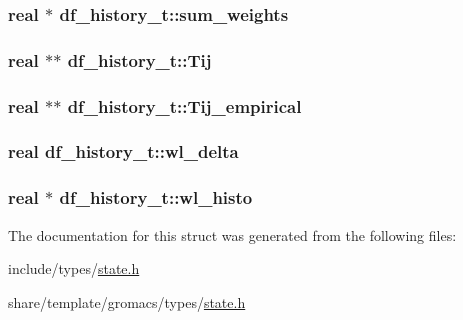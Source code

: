 \hypertarget{structdf__history__t_a45cdb272f6c0ecac43c61c3aa3255e80}{
\subsubsection[{sum\-\_\-weights}]{\setlength{\rightskip}{0pt plus 5cm}real $\ast$ {\bf df\-\_\-history\-\_\-t\-::sum\-\_\-weights}}}\label{structdf__history__t_a45cdb272f6c0ecac43c61c3aa3255e80}
\hypertarget{structdf__history__t_ad2324c9d3cc846308921afb723eca028}{
\subsubsection[{\-Tij}]{\setlength{\rightskip}{0pt plus 5cm}real $\ast$$\ast$ {\bf df\-\_\-history\-\_\-t\-::\-Tij}}}\label{structdf__history__t_ad2324c9d3cc846308921afb723eca028}
\hypertarget{structdf__history__t_ab0ff31b1e50e2c36742dc2391a0820ae}{
\subsubsection[{\-Tij\-\_\-empirical}]{\setlength{\rightskip}{0pt plus 5cm}real $\ast$$\ast$ {\bf df\-\_\-history\-\_\-t\-::\-Tij\-\_\-empirical}}}\label{structdf__history__t_ab0ff31b1e50e2c36742dc2391a0820ae}
\hypertarget{structdf__history__t_ac90f47b13716d3b369111abdf03683d4}{
\subsubsection[{wl\-\_\-delta}]{\setlength{\rightskip}{0pt plus 5cm}real {\bf df\-\_\-history\-\_\-t\-::wl\-\_\-delta}}}\label{structdf__history__t_ac90f47b13716d3b369111abdf03683d4}
\hypertarget{structdf__history__t_a77a72d9e45ef2ff711a10e1675ce563d}{
\subsubsection[{wl\-\_\-histo}]{\setlength{\rightskip}{0pt plus 5cm}real $\ast$ {\bf df\-\_\-history\-\_\-t\-::wl\-\_\-histo}}}\label{structdf__history__t_a77a72d9e45ef2ff711a10e1675ce563d}


\-The documentation for this struct was generated from the following files\-:\begin{DoxyCompactItemize}
\item 
include/types/\hyperlink{include_2types_2state_8h}{state.\-h}\item 
share/template/gromacs/types/\hyperlink{share_2template_2gromacs_2types_2state_8h}{state.\-h}\end{DoxyCompactItemize}
